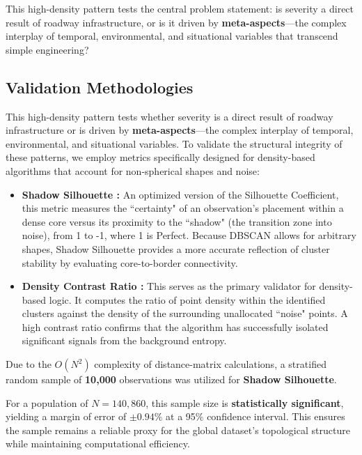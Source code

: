 \documentclass[conference]{IEEEtran}
\begin{document}
This high-density pattern tests the central problem statement: is severity a direct result of roadway infrastructure, or is it driven by \textbf{meta-aspects}—the complex interplay of temporal, environmental, and situational variables that transcend simple engineering?

\vspace{2mm}

\subsection{\textbf{Validation Methodologies}}

This high-density pattern tests whether severity is a direct result of roadway infrastructure or is driven by \textbf{meta-aspects}---the complex interplay of temporal, environmental, and situational variables. To validate the structural integrity of these patterns, we employ metrics specifically designed for density-based algorithms that account for non-spherical shapes and noise:

\begin{itemize}
	\item \textbf{Shadow Silhouette \cite{Maia2017}:} An optimized version of the Silhouette Coefficient, this metric measures the ``certainty" of an observation's placement within a dense core versus its proximity to the ``shadow" (the transition zone into noise), from 1 to -1, where 1 is Perfect. Because DBSCAN allows for arbitrary shapes, Shadow Silhouette provides a more accurate reflection of cluster stability by evaluating core-to-border connectivity.
	
	\item \textbf{Density Contrast Ratio \cite{Volker2024}:} This serves as the primary validator for density-based logic. It computes the ratio of point density within the identified clusters against the density of the surrounding unallocated ``noise" points. A high contrast ratio confirms that the algorithm has successfully isolated significant signals from the background entropy.
\end{itemize}

\indent Due to the $O(N^2)$ complexity of distance-matrix calculations, a stratified random sample of \textbf{10,000} observations was utilized for \textbf{Shadow Silhouette}.

 For a population of $N=140,860$, this sample size is \textbf{statistically significant}, yielding a margin of error of $\pm0.94\%$ at a 95\% confidence interval. This ensures the sample remains a reliable proxy for the global dataset's topological structure while maintaining computational efficiency.
\end{document}
